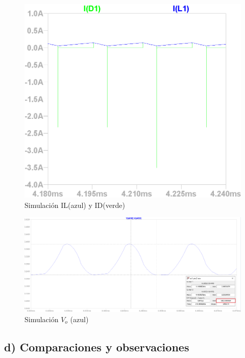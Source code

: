 \documentclass[e4_tp1_main.tex]{subfiles}
\begin{document}
\begin{figure}[H]
  \centering
    \includegraphics[scale=1]{Imagenes/punto2/PicodeIrr}
  \caption{Simulaci\'on IL(azul) y ID(verde)}
  \label{fig:IL&ID}
\end{figure}



\begin{figure}[H]
  \centering
    \includegraphics[scale = 0.2]{Imagenes/punto2/Vo-D=0,711.PNG}
  \caption{Simulaci\'on $V_o$ (azul)}
  \label{fig:IL&ID}
\end{figure}

\subsection*{d) Comparaciones y observaciones}
\end{document}
